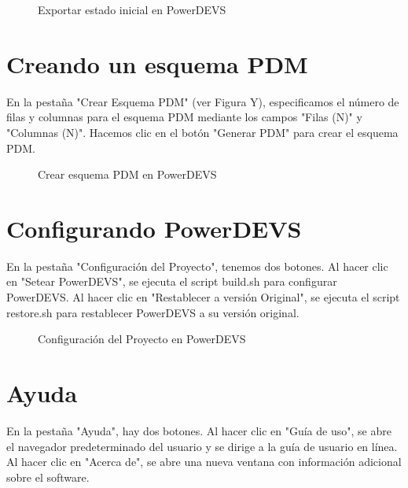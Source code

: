 \documentclass[]{article}
\begin{document}
    \begin{figure}[H]
    \centering
    \caption{Exportar estado inicial en PowerDEVS}
    \label{fig:exportar_estado_inicial}
    \end{figure}
    
    \section{Creando un esquema PDM}
    
    En la pestaña "Crear Esquema PDM" (ver Figura Y), especificamos el número de filas y columnas para el esquema PDM mediante los campos "Filas (N)" y "Columnas (N)". Hacemos clic en el botón "Generar PDM" para crear el esquema PDM.
    
    \begin{figure}[H]
    \centering
    \caption{Crear esquema PDM en PowerDEVS}
    \label{fig:crear_esquema_pdm}
    \end{figure}
    
    \section{Configurando PowerDEVS}
    
    En la pestaña "Configuración del Proyecto", tenemos dos botones. Al hacer clic en "Setear PowerDEVS", se ejecuta el script build.sh para configurar PowerDEVS. Al hacer clic en "Restablecer a versión Original", se ejecuta el script restore.sh para restablecer PowerDEVS a su versión original.
    
    \begin{figure}[H]
    \centering
    \caption{Configuración del Proyecto en PowerDEVS}
    \label{fig:configuracion_del_proyecto}
    \end{figure}
    
    \section{Ayuda}
    
    En la pestaña "Ayuda", hay dos botones. Al hacer clic en "Guía de uso", se abre el navegador predeterminado del usuario y se dirige a la guía de usuario en línea. Al hacer clic en "Acerca de", se abre una nueva ventana con información adicional sobre el software.
    
\end{document}
